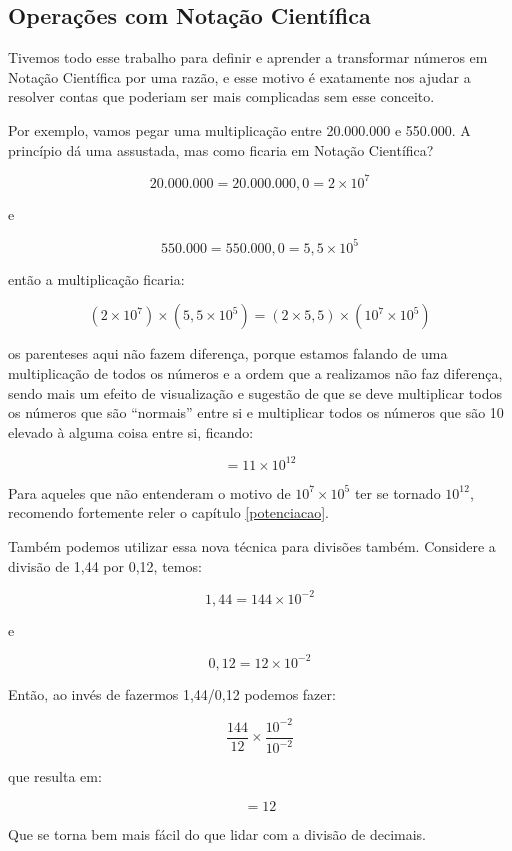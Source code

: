 \subsection{Operações com Notação Científica}

Tivemos todo esse trabalho para definir e aprender a transformar números em Notação Científica por uma razão, e esse motivo é exatamente nos ajudar a resolver contas que poderiam ser mais complicadas sem esse conceito.

Por exemplo, vamos pegar uma multiplicação entre 20.000.000 e 550.000. A princípio dá uma assustada, mas como ficaria em Notação Científica?

\begin{equation}
    20.000.000=20.000.000,0=2\times10^7
\end{equation}

e

\begin{equation}
    550.000= 550.000,0 = 5,5\times10^5
\end{equation}

então a multiplicação ficaria:

\begin{equation}
    (2\times10^7)\times(5,5\times10^5)=(2\times5,5)\times(10^7\times10^5)
\end{equation}

os parenteses aqui não fazem diferença, porque estamos falando de uma multiplicação de todos os números e a ordem que a realizamos não faz diferença, sendo mais um efeito de visualização e sugestão de que se deve multiplicar todos os números que são ``normais'' entre si e multiplicar todos os números que são 10 elevado à alguma coisa entre si, ficando:

\begin{equation}
    =11\times10^{12}
\end{equation}

Para aqueles que não entenderam o motivo de \(10^7\times10^5\) ter se tornado \(10^{12}\), recomendo fortemente reler o capítulo \ref{potenciacao}.

Também podemos utilizar essa nova técnica para divisões também. Considere a divisão de 1,44 por 0,12, temos:

\begin{equation}
    1,44=144\times10^{-2}
\end{equation}

e

\begin{equation}
    0,12=12\times10^{-2}
\end{equation}

Então, ao invés de fazermos 1,44/0,12 podemos fazer:

\begin{equation}
    \frac{144}{12}\times\frac{10^{-2}}{10^{-2}}
\end{equation}

que resulta em:

\begin{equation}
    =12
\end{equation}

Que se torna bem mais fácil do que lidar com a divisão de decimais. 